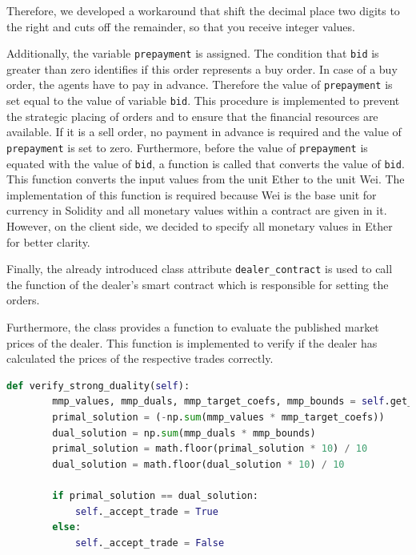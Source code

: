 Therefore, we developed a workaround that shift the decimal place two digits to the right and cuts off the remainder,
so that you receive integer values. 

Additionally, the variable \verb|prepayment| is assigned. 
The condition that \verb|bid| is greater than zero identifies if this order represents a buy order.
In case of a buy order, the agents have to pay in advance.
Therefore the value of \verb|prepayment| is set equal to the value of variable \verb|bid|. 
This procedure is implemented to prevent the strategic placing of orders and to ensure that the financial resources are available.
If it is a sell order, no payment in advance is required and the value of \verb|prepayment| is set to zero.
Furthermore, before the value of \verb|prepayment| is equated with the value of \verb|bid|, a function is called that converts the value of \verb|bid|. This function converts the input values from the unit Ether to the unit
Wei. 
The implementation of this function is required because Wei is the base unit for currency in Solidity
and all monetary values within a contract are given in it. However, on the client side, we decided to specify all monetary values in Ether
for better clarity.

Finally, the already introduced class attribute \verb|dealer_contract| is used to call the function of the dealer's smart contract which is
responsible for setting the orders.

Furthermore, the class provides a function to evaluate the published market prices of the dealer. 
This function is implemented to verify if the dealer has calculated the prices of the respective trades 
correctly.  

\begin{lstlisting}[float=htbp, label=lst:verify_trade, caption=Verification of trades, language=Python]
    def verify_strong_duality(self):
        mmp_values, mmp_duals, mmp_target_coefs, mmp_bounds = self.get_mmp_attributes()
        primal_solution = (-np.sum(mmp_values * mmp_target_coefs))
        dual_solution = np.sum(mmp_duals * mmp_bounds)
        primal_solution = math.floor(primal_solution * 10) / 10
        dual_solution = math.floor(dual_solution * 10) / 10

        if primal_solution == dual_solution:
            self._accept_trade = True
        else:
            self._accept_trade = False
\end{lstlisting}

